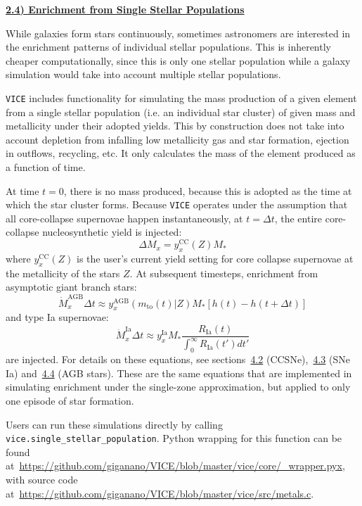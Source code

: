 \documentclass{report}
\newcommand\ddfrac[2]{\frac{\displaystyle #1}{\displaystyle #2}}
\begin{document}
\newpage 
\noindent 
\begin{center}
\hypertarget{ssp:enrichment}{
	\underline{\LARGE 
		\textbf{2.4) Enrichment from Single Stellar Populations} 
	}
}
\end{center}
While galaxies form stars continuously, sometimes astronomers are interested 
in the enrichment patterns of individual stellar populations. This is 
inherently cheaper computationally, since this is only one stellar population 
while a galaxy simulation would take into account multiple stellar populations. 
\par
\texttt{VICE} includes functionality for simulating the mass production of a 
given element from a single stellar population (i.e. an individual star 
cluster) of given mass and metallicity under their adopted yields. This by 
construction does not take into account depletion from infalling low 
metallicity gas and star formation, ejection in outflows, recycling, etc. It 
only calculates the mass of the element produced as a function of time. 
\par
At time $t = 0$, there is no mass produced, because this is adopted as the 
time at which the star cluster forms. Because \texttt{VICE} operates under 
the assumption that all core-collapse supernovae happen instantaneously, at 
$t = \Delta t$, the entire core-collapse nucleosynthetic yield is injected: 
\begin{equation}
\Delta M_x = y_x^\text{CC}(Z)M_*
\end{equation}
where $y_x^\text{CC}(Z)$ is the user's current yield setting for core collapse 
supernovae at the metallicity of the stars $Z$. At subsequent timesteps, 
enrichment from asymptotic giant branch stars: 
\begin{equation} 
\dot{M}_x^\text{AGB}\Delta t \approx y_x^\text{AGB}(m_\text{to}(t) | Z) 
M_* [h(t) - h(t + \Delta t)]
\end{equation}
and type Ia supernovae: 
\begin{equation}
\dot{M}_x^\text{Ia}\Delta t \approx y_x^\text{Ia}M_*\ddfrac{
	R_\text{Ia}(t)
}{
	\int_0^\infty R_\text{Ia}(t')dt'
}
\end{equation}
are injected. For details on these equations, see 
sections~\hyperlink{enrichment:ccsne}{4.2} 
(CCSNe),~\hyperlink{enrichment:sneia}{4.3} (SNe Ia) 
and~\hyperlink{enrichment:agb}{4.4} (AGB stars). These are the same equations 
that are implemented in simulating enrichment under the single-zone 
approximation, but applied to only one episode of star formation. 
\par
Users can run these simulations directly by calling 
\texttt{vice.single\_stellar\_population}. Python wrapping for this function 
can be found 
at~\url{https://github.com/giganano/VICE/blob/master/vice/core/_wrapper.pyx}, 
with source code 
at~\url{https://github.com/giganano/VICE/blob/master/vice/src/metals.c}. 
\end{document}
